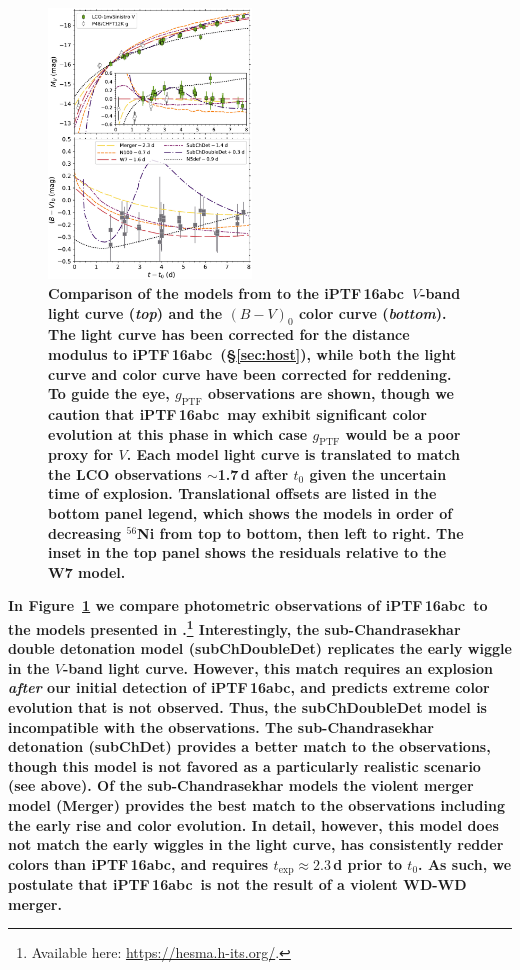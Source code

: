 \documentclass[twocolumn]{aastex61}
\newcommand{\abc}{iPTF\,16abc}
\begin{document}
\begin{figure}[]
  \centering
  \includegraphics[width=0.48\textwidth]{compare_Noebauer.pdf}
  \caption{
  \textbf{Comparison of the models from \citet{2017MNRAS.472.2787N} to the
  \abc\ $V$-band light curve (\textit{top}) and the $(B-V)_0$ color curve
  (\textit{bottom}). The light curve has been corrected for the distance
  modulus to \abc\ (\S\ref{sec:host}), while both the light curve and color
  curve have been corrected for reddening. To guide the eye,
  $g_\mathrm{PTF}$ observations are shown, though we caution
  that \abc\ may exhibit significant color evolution at this phase in which
  case $g_\mathrm{PTF}$ would be a poor proxy for $V$. Each model light curve
  is translated to match the LCO observations $\sim$1.7\,d after $t_0$ given
  the uncertain time of explosion. Translational offsets are listed in the
  bottom panel legend, which shows the models in order of decreasing
  $^{56}$Ni from top to bottom, then left to right. The inset in
  the top panel shows the residuals relative to the W7 model.} }
  \label{fig:noebauer} 
\end{figure}

\textbf{In Figure~\ref{fig:noebauer} we compare photometric observations of
\abc\ to the models presented in
\citet{2017MNRAS.472.2787N}.\footnote{Available here:
\url{https://hesma.h-its.org/}.} Interestingly, the sub-Chandrasekhar double
detonation model (subChDoubleDet) replicates the early wiggle in the $V$-band
light curve. However, this match requires an explosion \textit{after} our
initial detection of \abc, and predicts extreme color evolution that is not
observed. Thus, the subChDoubleDet model is incompatible with the
observations. The sub-Chandrasekhar detonation (subChDet) provides a better
match to the observations, though this model is not favored as a particularly
realistic scenario (see above). Of the sub-Chandrasekhar models the violent
merger model (Merger) provides the best match to the observations including
the early rise and color evolution. In detail, however, this model does not
match the early wiggles in the light curve, has consistently redder colors
than \abc, and requires $t_\mathrm{exp} \approx 2.3$\,d prior to $t_0$. As
such, we postulate that \abc\ is not the result of a violent WD-WD merger.}
\end{document}
